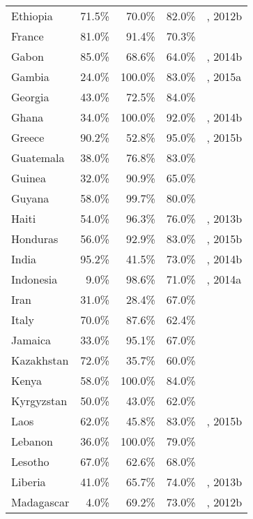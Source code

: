 \begin{longtable}{lrrrl}
  Ethiopia & 71.5\% & 70.0\% & 82.0\% & \cite{Unaids2016-am, usaid2013}, 2012b \\
  France & 81.0\% & 91.4\% & 70.3\% & \cite{aid2014} \\
  Gabon & 85.0\% & 68.6\% & 64.0\% & \cite{Unaids2016-an}, 2014b \\
  Gambia & 24.0\% & 100.0\% & 83.0\% & \cite{Unaids2016-an}, 2015a \\
  Georgia & 43.0\% & 72.5\% & 84.0\% & \cite{Unaids2016-an} \\
  Ghana & 34.0\% & 100.0\% & 92.0\% & \cite{Unaids2016-an}, 2014b \\
  Greece & 90.2\% & 52.8\% & 95.0\% & \cite{Unaids2016-an, Unaids2016-am}, 2015b \\
  Guatemala & 38.0\% & 76.8\% & 83.0\% & \cite{Unaids2016-an} \\
  Guinea & 32.0\% & 90.9\% & 65.0\% & \cite{Unaids2016-an} \\
  Guyana & 58.0\% & 99.7\% & 80.0\% & \cite{Unaids2016-an} \\
  Haiti & 54.0\% & 96.3\% & 76.0\% & \cite{Unaids2016-an}, 2013b \\
  Honduras & 56.0\% & 92.9\% & 83.0\% & \cite{Unaids2016-an}, 2015b \\
  India & 95.2\% & 41.5\% & 73.0\% & \cite{AIDSdatahub-fg}, 2014b \\
  Indonesia & 9.0\% & 98.6\% & 71.0\% & \cite{Unaids2016-an}, 2014a \\
  Iran & 31.0\% & 28.4\% & 67.0\% & \cite{Unaids2016-an} \\
  Italy & 70.0\% & 87.6\% & 62.4\% & \cite{camoni2015estimating}  \\
  Jamaica & 33.0\% & 95.1\% & 67.0\% & \cite{Unaids2016-an} \\
  Kazakhstan & 72.0\% & 35.7\% & 60.0\% & \cite{Unaids2016-an} \\
  Kenya & 58.0\% & 100.0\% & 84.0\% & \cite{Unaids2016-an} \\
  Kyrgyzstan & 50.0\% & 43.0\% & 62.0\% & \cite{Unaids2016-an} \\
  Laos & 62.0\% & 45.8\% & 83.0\% & \cite{AIDSdatahub-fg}, 2015b \\
  Lebanon & 36.0\% & 100.0\% & 79.0\% & \cite{Unaids2016-an} \\
  Lesotho & 67.0\% & 62.6\% & 68.0\% & \cite{Unaids2016-an} \\
  Liberia & 41.0\% & 65.7\% & 74.0\% & \cite{Unaids2016-an}, 2013b \\
  Madagascar & 4.0\% & 69.2\% & 73.0\% & \cite{Unaids2016-an}, 2012b \\

\end{longtable}
